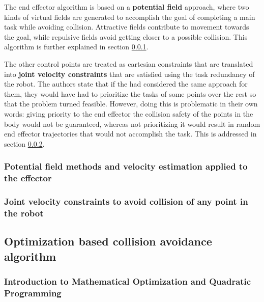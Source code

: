 The end effector algorithm is based on a \textbf{potential field} approach, where two kinds of virtual fields are generated to accomplish the goal of completing a main task while avoiding collision. Attractive fields contribute to movement towards the goal, while repulsive fields avoid getting closer to a possible collision. This algorithm is further explained in section  \ref{sss:flaccorepulsive}.

The other control points are treated as cartesian constraints that are translated into \textbf{joint velocity constraints} that are satisfied using the task redundancy of the robot. The authors state that if the had considered the same approach for them, they would have had to prioritize the tasks of some points over the rest so that the problem turned feasible. However, doing this is problematic in their own words: giving priority to the end effector the collision safety of the points in the body would not be guaranteed, whereas not prioritizing it would result in random end effector trajectories that would not accomplish the task. This is addressed in section \ref{sss:flaccobody}.

\subsubsection{Potential field methods and velocity estimation applied to the effector}
\label{sss:flaccorepulsive}

\blindtext

\subsubsection{Joint velocity constraints to avoid collision of any point in the robot}
\label{sss:flaccobody}

\blindtext

\subsection{Optimization based collision avoidance algorithm}
\label{ss:optimization}


\blindtext

\subsubsection{Introduction to Mathematical Optimization and Quadratic Programming}
\label{sss:optimizationintro}

